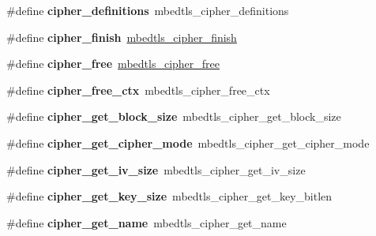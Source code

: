 \begin{DoxyCompactItemize}
\mbox{\label{compat-1_83_8h_af3d10452dd1301d15e115c99f170897e}} 
\#define {\bfseries cipher\+\_\+definitions}~mbedtls\+\_\+cipher\+\_\+definitions
\item 
\mbox{\label{compat-1_83_8h_ae1311926624bb23225b2bfb0357cdd67}} 
\#define {\bfseries cipher\+\_\+finish}~\mbox{\hyperlink{cipher_8h_a6678691c02cb3f1322b2179987bfffb2}{mbedtls\+\_\+cipher\+\_\+finish}}
\item 
\mbox{\label{compat-1_83_8h_ad91395cedf4f7c01a593333e4bee0c4d}} 
\#define {\bfseries cipher\+\_\+free}~\mbox{\hyperlink{cipher_8h_a903c4146b471207690988584b83854a9}{mbedtls\+\_\+cipher\+\_\+free}}
\item 
\mbox{\label{compat-1_83_8h_a9d66d119ef6ee7364582deceeebf198c}} 
\#define {\bfseries cipher\+\_\+free\+\_\+ctx}~mbedtls\+\_\+cipher\+\_\+free\+\_\+ctx
\item 
\mbox{\label{compat-1_83_8h_ace2d28c663917b73b6da92bc4f3afb3a}} 
\#define {\bfseries cipher\+\_\+get\+\_\+block\+\_\+size}~mbedtls\+\_\+cipher\+\_\+get\+\_\+block\+\_\+size
\item 
\mbox{\label{compat-1_83_8h_aa1afd9b3d48649b6fd0d674355878149}} 
\#define {\bfseries cipher\+\_\+get\+\_\+cipher\+\_\+mode}~mbedtls\+\_\+cipher\+\_\+get\+\_\+cipher\+\_\+mode
\item 
\mbox{\label{compat-1_83_8h_af3878046b721b580a9b2c01bcb0b50b1}} 
\#define {\bfseries cipher\+\_\+get\+\_\+iv\+\_\+size}~mbedtls\+\_\+cipher\+\_\+get\+\_\+iv\+\_\+size
\item 
\mbox{\label{compat-1_83_8h_a738c49e3c57c0661f2b6f58bebbb330a}} 
\#define {\bfseries cipher\+\_\+get\+\_\+key\+\_\+size}~mbedtls\+\_\+cipher\+\_\+get\+\_\+key\+\_\+bitlen
\item 
\mbox{\label{compat-1_83_8h_a98571f089b143b76f31fb77a12703647}} 
\#define {\bfseries cipher\+\_\+get\+\_\+name}~mbedtls\+\_\+cipher\+\_\+get\+\_\+name
\item 
\mbox{\label{compat-1_83_8h_aaa6dd7f2c66c65b00095e416fa98d982}} 

\end{DoxyCompactItemize}
